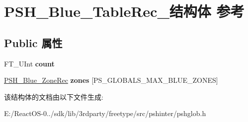 \hypertarget{struct_p_s_h___blue___table_rec__}{}\section{P\+S\+H\+\_\+\+Blue\+\_\+\+Table\+Rec\+\_\+结构体 参考}
\label{struct_p_s_h___blue___table_rec__}
\subsection*{Public 属性}
\begin{DoxyCompactItemize}
\item 
\mbox{\label{struct_p_s_h___blue___table_rec___a20c47e75c99471378ee6cd7bba745e29}} 
F\+T\+\_\+\+U\+Int {\bfseries count}
\item 
\mbox{\label{struct_p_s_h___blue___table_rec___a81f477ba33c7de685c36ac8afa32efa2}} 
\hyperlink{struct_p_s_h___blue___zone_rec__}{P\+S\+H\+\_\+\+Blue\+\_\+\+Zone\+Rec} {\bfseries zones} \mbox{[}P\+S\+\_\+\+G\+L\+O\+B\+A\+L\+S\+\_\+\+M\+A\+X\+\_\+\+B\+L\+U\+E\+\_\+\+Z\+O\+N\+ES\mbox{]}
\end{DoxyCompactItemize}


该结构体的文档由以下文件生成\+:\begin{DoxyCompactItemize}
\item 
E\+:/\+React\+O\+S-\/0../sdk/lib/3rdparty/freetype/src/pshinter/pshglob.\+h\end{DoxyCompactItemize}
